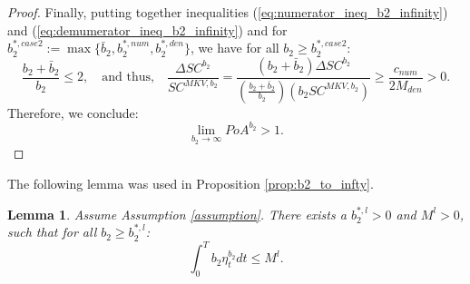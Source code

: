 \documentclass[11pt]{article}
\newtheorem{lemma}{Lemma}
\begin{document}
\begin{proof}
		
	Finally, putting together inequalities (\ref{eq:numerator_ineq_b2_infinity}) and (\ref{eq:demumerator_ineq_b2_infinity}) and for $b_2^{*,case 2} := \max \{ \bar{b}_2,  b_2^{*,num}, b_2^{*,den} \}$, we have for all $b_2 \geq b_2^{*,case 2}$:
	\begin{equation*}
		\frac{b_2+\bar{b}_2}{b_2} \leq 2, \quad \text{and thus,} \quad \frac{\Delta SC^{b_2}}{SC^{MKV,b_2}} = \frac{(b_2 + \bar{b}_2) \Delta SC^{b_2} }{\left(\frac{b_2 + \bar{b}_2}{b_2} \right) (b_2 SC^{MKV,b_2} ) } \geq \frac{c_{num}}{ 2 M_{den}} > 0.
	\end{equation*}
	Therefore, we conclude: 
	$$ \lim_{b_2 \to \infty} PoA^{b_2} > 1.$$ 
\end{proof}


The following lemma was used in Proposition \ref{prop:b2_to_infty}.
\begin{lemma}
	Assume Assumption \ref{assumption}. There exists a $b_2^{*,l}>0$ and $M^l>0$, such that for all $b_2 \geq b_2^{*,l}$:
	$$\int_0^T b_2 \eta^{b_2}_t dt \leq M^l.$$
	\label{lemma:int_b2_eta_t}
\end{lemma}
\end{document}
